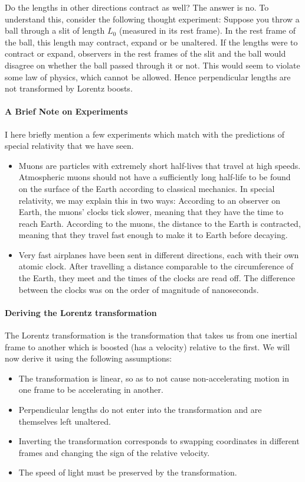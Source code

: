 Do the lengths in other directions contract as well? The answer is no. To understand this, consider the following thought experiment: Suppose you throw a ball through a slit of length $L_{0}$ (measured in its rest frame). In the rest frame of the ball, this length may contract, expand or be unaltered. If the lengths were to contract or expand, observers in the rest frames of the slit and the ball would disagree on whether the ball passed through it or not. This would seem to violate some law of physics, which cannot be allowed. Hence perpendicular lengths are not transformed by Lorentz boosts.

\paragraph{A Brief Note on Experiments}
I here briefly mention a few experiments which match with the predictions of special relativity that we have seen.
\begin{itemize}
	\item Muons are particles with extremely short half-lives that travel at high speeds. Atmospheric muons should not have a sufficiently long half-life to be found on the surface of the Earth according to classical mechanics. In special relativity, we may explain this in two ways: According to an observer on Earth, the muons' clocks tick slower, meaning that they have the time to reach Earth. According to the muons, the distance to the Earth is contracted, meaning that they travel fast enough to make it to Earth before decaying.
	\item Very fast airplanes have been sent in different directions, each with their own atomic clock. After travelling a distance comparable to the circumference of the Earth, they meet and the times of the clocks are read off. The difference between the clocks was on the order of magnitude of nanoseconds.
\end{itemize}

\paragraph{Deriving the Lorentz transformation}
The Lorentz transformation is the transformation that takes us from one inertial frame to another which is boosted (has a velocity) relative to the first. We will now derive it using the following assumptions:
\begin{itemize}
	\item The transformation is linear, so as to not cause non-accelerating motion in one frame to be accelerating in another.
	\item Perpendicular lengths do not enter into the transformation and are themselves left unaltered.
	\item Inverting the transformation corresponds to swapping coordinates in different frames and changing the sign of the relative velocity.
	\item The speed of light must be preserved by the transformation.
\end{itemize}

